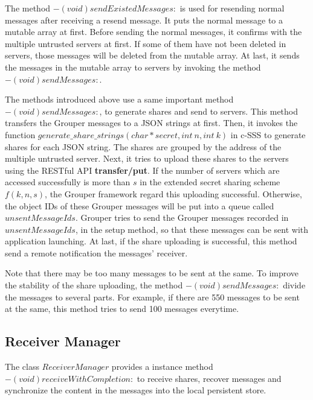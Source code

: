 \documentclass[a4paper,11pt]{report}
\begin{document}
The method $- (void)sendExistedMessages:$ is used for resending normal messages after receiving a resend message.
It puts the normal message to a mutable array at first.
Before sending the normal messages, it confirms with the multiple untrusted servers at first.
If some of them have not been deleted in servers, those messages will be deleted from the mutable array.
At last, it sends the messages in the mutable array to servers by invoking the method $- (void)sendMessages:$.

The methods introduced above use a same important method $- (void)sendMessages:$, to generate shares and send to servers.
This method transfers the Grouper messages to a JSON strings at first.
Then, it invokes the function $generate\_share\_strings(char * secret, int\ n, int\ k)$ in c-SSS\cite{c-sss} to generate shares for each JSON string.
The shares are grouped by the address of the multiple untrusted server.
Next, it tries to upload these shares to the servers using the RESTful API \textbf{transfer/put}.
If the number of servers which are accessed successfully is more than $s$ in the extended secret sharing scheme $f(k, n, s)$, the Grouper framework regard this uploading successful.
Otherwise, the object IDs of these Grouper messages will be put into a queue called $unsentMessageIds$.
Grouper tries to send the Grouper messages recorded in $unsentMessageIds$, in the setup method, so that these messages can be sent with application launching.
At last, if the share uploading is successful, this method send a remote notification the messages' receiver.

Note that there may be too many messages to be sent at the same.
To improve the stability of the share uploading, the method $- (void)sendMessages:$ divide the messages to several parts.
For example, if there are 550 messages to be sent at the same, this method tries to send 100 messages everytime.

\subsection{Receiver Manager}

The class $ReceiverManager$ provides a instance method $- (void)receiveWithCompletion:$ to receive shares, recover messages and synchronize the content in the messages into the local persistent store.
\end{document}
